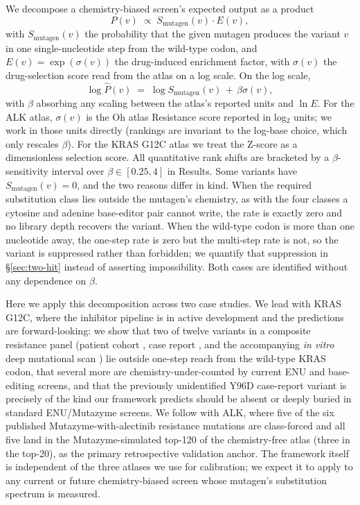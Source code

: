 \documentclass[11pt,a4paper]{article}
\begin{document}
We decompose a chemistry-biased screen's expected output as a product
\begin{equation}
    P(v) \;\propto\; S_{\mathrm{mutagen}}(v) \cdot E(v),
\label{eq:decomp}
\end{equation}
with $S_{\mathrm{mutagen}}(v)$ the probability that the given mutagen
produces the variant $v$ in one single-nucleotide step from the
wild-type codon, and $E(v) = \exp(\sigma(v))$ the drug-induced
enrichment factor, with $\sigma(v)$ the drug-selection score read
from the atlas on a log scale. On the log scale,
\begin{equation}
    \log \hat P(v) \;=\; \log S_{\mathrm{mutagen}}(v) \,+\, \beta \sigma(v),
\label{eq:decomp2}
\end{equation}
with $\beta$ absorbing any scaling between the atlas's reported units
and $\ln E$. For the ALK atlas, $\sigma(v)$ is the Oh atlas Resistance
score reported in log$_2$ units; we work in those units directly
(rankings are invariant to the log-base choice, which only rescales
$\beta$). For the KRAS G12C atlas we treat the Z-score as a
dimensionless selection score. All quantitative rank shifts are
bracketed by a $\beta$-sensitivity interval over $\beta \in [0.25, 4]$
in Results.
Some variants have $S_{\mathrm{mutagen}}(v) = 0$, and the two reasons
differ in kind. When the required substitution class lies outside the
mutagen's chemistry, as with the four classes a cytosine and adenine
base-editor pair cannot write, the rate is exactly zero and no library
depth recovers the variant. When the wild-type codon is more than one
nucleotide away, the one-step rate is zero but the multi-step rate is
not, so the variant is suppressed rather than forbidden; we quantify
that suppression in \S\ref{sec:two-hit} instead of asserting
impossibility. Both cases are identified without any dependence on
$\beta$.

Here we apply this decomposition across two case studies. We lead with
KRAS G12C, where the inhibitor pipeline is in active development and the
predictions are forward-looking: we show that two of twelve variants in a
composite resistance panel (patient cohort \citep{awad2021}, case report
\citep{tanaka2021}, and the accompanying \textit{in vitro} deep
mutational scan \citep{awad2021}) lie outside one-step reach from
the wild-type KRAS codon, that several more are chemistry-under-counted
by current ENU and base-editing screens, and that the previously
unidentified Y96D case-report variant \citep{tanaka2021} is precisely
of the kind our framework predicts should be absent or deeply buried in
standard ENU/Mutazyme screens. We follow with ALK, where five of the
six published Mutazyme-with-alectinib resistance mutations
\citep{doi2022} are class-forced and all five land in the
Mutazyme-simulated top-120 of the chemistry-free atlas (three in the
top-20), as the primary retrospective validation anchor. The framework itself is
independent of the three atlases we use for calibration; we expect it to
apply to any current or future chemistry-biased screen whose mutagen's
substitution spectrum is measured.
\end{document}
